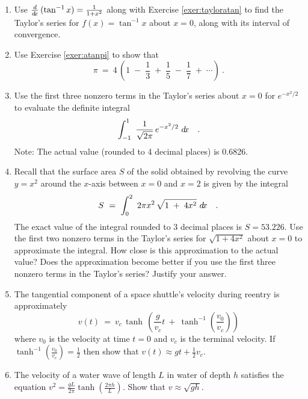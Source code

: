 {\begin{enumerate}[item-label={\bfseries \arabic*.}]
 \item\label{exer:atanpi} Use $\frac{d}{d\!x}\,(\tan^{-1} x) = \frac{1}{1+x^2}$ along with
  Exercise \ref{exer:tayloratan} to find the Taylor's series for
  $f(x)=\tan^{-1} x$ about $x=0$, along with its interval of convergence.
 \item Use Exercise \ref{exer:atanpi} to show that
\[
\pi ~=~ 4\,\left(1 \;-\; \frac{1}{3} \;+\; \frac{1}{5} \;-\; \frac{1}{7}
\;+\; \cdots \right) ~.
\]
 \item Use the first three nonzero terms in the Taylor's series about $x=0$ for
 $e^{-x^2/2}$ to evaluate the definite integral
 \begin{displaymath}
  \int_{-1}^1 ~\frac{1}{\sqrt{2\pi}} \,e^{-x^2/2}~d\!x \quad .
 \end{displaymath}
  Note: The actual value (rounded to 4 decimal places) is 0.6826.
 \item Recall that the surface area $S$ of the solid obtained by revolving the
  curve $y = x^2$ around the $x$-axis between $x = 0$ and $x = 2$ is given by
  the integral
 \begin{displaymath}
  S ~=~ \int_0^2 ~2 \pi x^2 \,\sqrt{1 \;+\; 4x^2}~d\!x \quad .
 \end{displaymath}
 The exact value of the integral rounded to 3 decimal places is $S = 53.226$.
 Use the first two nonzero terms in the Taylor's series for $\sqrt{1 + 4x^2}$
 about $x=0$ to approximate the integral. How close is this approximation to the
 actual value? Does the approximation become better if you use the first three
 nonzero terms in the Taylor's series? Justify your answer.
 \item The tangential component of a space shuttle's velocity during reentry is
 approximately
\[
 v(t) ~=~ v_c \,\tanh\,\left( \frac{g}{v_c} t ~+~
 \tanh^{-1} \left(\frac{v_0}{v_c}\right) \right)
\]
  where $v_0$ is the velocity at time $t=0$ and $v_c$ is the terminal velocity.
  If $\tanh^{-1} \left(\frac{v_0}{v_c}\right) = \frac{1}{2}$ then show that
  $v(t) \approx gt + \frac{1}{2}v_c$.
 \item The velocity of a water wave of length $L$ in water of depth $h$
 satisfies the equation
 $v^2 = \frac{gL}{2\pi} \tanh \left( \frac{2\pi h}{L}\right)$. Show that
 $v \approx \sqrt{gh}$.

\end{enumerate}}
